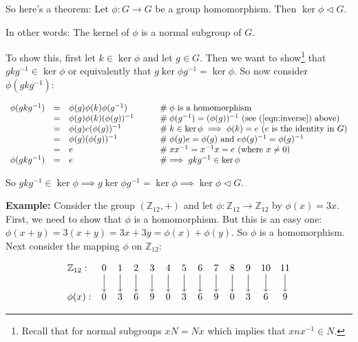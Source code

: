 \documentclass[11pt, oneside]{article}   	%
\theoremstyle{definition}
\DeclareMathOperator{\bda}{\Big \downarrow}
\begin{document}
\bigskip
\noindent
So here's a theorem:  Let $\phi: G \rightarrow G$ be a  group homomorphism. Then $\ker \phi  \lhd  G$.


\bigskip
\noindent 
In other words:  The kernel of $\phi$ is a normal subgroup of $G$. 

\bigskip
\noindent
To show this, first let $k \in \ker \phi$ and let $g \in G$. Then we 
want to show\footnote{Recall that for normal subgroups $xN = Nx$ which implies that $xnx^{-1} \in N$.}
that $gkg^{-1} \in  \ker \phi$ or equivalently that $g \ker \phi g^{-1} = \ker \phi$. So now consider $\phi(gkg^{-1})$:

\begin{equation*}
\begin{array}{rcll}
\phi(gkg^{-1})
&=& \phi(g)\phi(k)\phi(g^{-1})         &\qquad \mathrel{\#} \text{$\phi$ is a homomorphism}   \\
&=& \phi(g)\phi(k)(\phi(g))^{-1}       &\qquad \mathrel{\#} \phi(g^{-1})  = (\phi(g))^{-1} \text{ (see (\ref{eqn:inverse}) above)} \\
&=& \phi(g) e (\phi(g))^{-1}             &\qquad \mathrel{\#} k \in \ker \phi \implies \phi(k) = e  \text{ ($e$ is the identity in $G$)} \\
&=& \phi(g) (\phi(g))^{-1}                &\qquad \mathrel{\#} \phi(g) e = \phi(g) \text{ and } e   \phi(g)^{-1}  = \phi(g)^{-1} \\
&=& e                                             &\qquad \mathrel{\#} xx^{-1} = x^{-1} x = e \text{ (where $x \neq 0$)}  \\
\phi(gkg^{-1}) &=& e                      &\qquad \mathrel{\#} \implies gkg^{-1} \in  \ker \phi
\end{array}
\end{equation*}

\bigskip
\noindent
So $gkg^{-1} \in  \ker \phi \implies g \ker \phi g^{-1} = \ker \phi \implies \ker \phi \lhd G$. 

\bigskip
\noindent
\textbf{Example:} Consider the group $(\mathbb{Z}_{12},+)$ and let $\phi: \mathbb{Z}_{12} \rightarrow \mathbb{Z}_{12}$ by  $\phi(x) = 3x$. 
First, we need to show that $\phi$ is a homomorphism. But this is an easy one:  $\phi(x+y) = 3 (x + y) = 3x + 3y = \phi(x) + \phi(y)$. 
So $\phi$ is a homomorphism. Next consider the mapping $\phi$ on $\mathbb{Z}_{12}$:

\bigskip
\begin{equation*}
\begin{array}{l c c c c c c c c c c c c}
\mathbb{Z}_{12}:  & 0      & 1      & 2      & 3      & 4      & 5      & 6      & 7      & 8      & 9      & 10    & 11 \\
                             & \bda & \bda & \bda & \bda & \bda & \bda & \bda & \bda & \bda & \bda & \bda & \bda \\
\phi(x):                  & 0      & 3      & 6      & 9      & 0      & 3      & 6      & 9      & 0      & 3      & 6      & 9 \\
\end{array}
\end{equation*}
\end{document}
